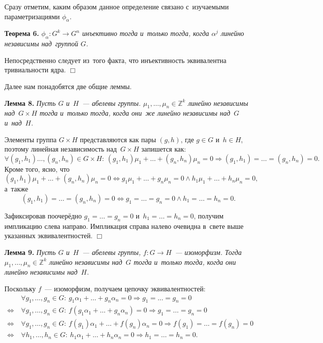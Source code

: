 \documentclass[twoside]{article}
\begin{document}
Сразу отметим, каким образом данное определение связано с~изучаемыми параметризациями $\phi_\alpha$.

\medskip\noindent\textbf{Теорема 6.}\emph{
    $\phi_\alpha : G^k \rightarrow G^n$ инъективно тогда и~только тогда, когда $\alpha^j$ линейно независимы над~группой $G$.
}\medskip

    Непосредственно следует из~того факта, что инъективность эквивалентна тривиальности ядра.
\hfill$\Box$\medskip

Далее нам понадобятся две общие леммы.

\medskip\noindent\textbf{Лемма 8.}\emph{
    Пусть $G$ и~$H$~— абелевы группы. $\mu_1, \ldots, \mu_n \in \mathbb{Z}^k$ линейно независимы над~$G \times H$
    тогда и~только тогда, когда они~же линейно независимы над~$G$ и~над~$H$.
}\medskip

    Элементы группа $G \times H$ представляются как пары $(g, h)$, где $g \in G$ и~$h \in H$, поэтому
    линейная независимость над~$G \times H$ запишется как:
    $$
        \forall (g_1, h_1) \ldots, (g_n, h_n) \in G \times H{:}\ (g_1, h_1) \mu_1 + \ldots + (g_n, h_n) \mu_n = 0 \Rightarrow (g_1, h_1) = \ldots = (g_n, h_n) = 0.
    $$
    Кроме того, ясно, что
    $$
        (g_1, h_1) \mu_1 + \ldots + (g_n, h_n) \mu_n = 0 \Leftrightarrow g_1 \mu_1 + \ldots + g_n \mu_n = 0 \wedge h_1 \mu_1 + \ldots + h_n \mu_n = 0,
    $$
    а~также
    $$
        (g_1, h_1) = \ldots = (g_n, h_n) = 0 \Leftrightarrow g_1 = \ldots = g_n = 0 \wedge h_1 = \ldots = h_n = 0.
    $$

    Зафиксировав поочерёдно $g_1 = \ldots = g_n = 0$ и~$h_1 = \ldots = h_n = 0$, получим импликацию слева направо.
    Импликация справа налево очевидна в~свете выше указанных эквивалентностей.
\hfill$\Box$\medskip

\medskip\noindent\textbf{Лемма 9.}\emph{
    Пусть $G$ и~$H$~— абелевы группы, $f : G \rightarrow H$~— изоморфизм. Тогда $\mu_1, \ldots, \mu_n \in \mathbb{Z}^k$
    линейно независимы над~$G$ тогда и~только тогда, когда они линейно независимы над~$H$.
}\medskip

    Поскольку $f$~— изоморфизм, получаем цепочку эквивалентностей:
    \begin{align*}
                       &\ \forall g_1, \ldots, g_n \in G{:}\ g_1 \alpha_1 + \ldots + g_n \alpha_n = 0 \Rightarrow g_1 = \ldots = g_n = 0 \\
        \Leftrightarrow&\ \forall g_1, \ldots, g_n \in G{:}\ f(g_1 \alpha_1 + \ldots + g_n \alpha_n) = 0 \Rightarrow g_1 = \ldots = g_n = 0 \\
        \Leftrightarrow&\ \forall g_1, \ldots, g_n \in G{:}\ f(g_1) \alpha_1 + \ldots + f(g_n) \alpha_n = 0 \Rightarrow f(g_1) = \ldots = f(g_n) = 0 \\
        \Leftrightarrow&\ \forall h_1, \ldots, h_n \in G{:}\ h_1 \alpha_1 + \ldots + h_n \alpha_n = 0 \Rightarrow h_1 = \ldots = h_n = 0.
        \tag*{$\Box$}
    \end{align*}
{}
\end{document}
